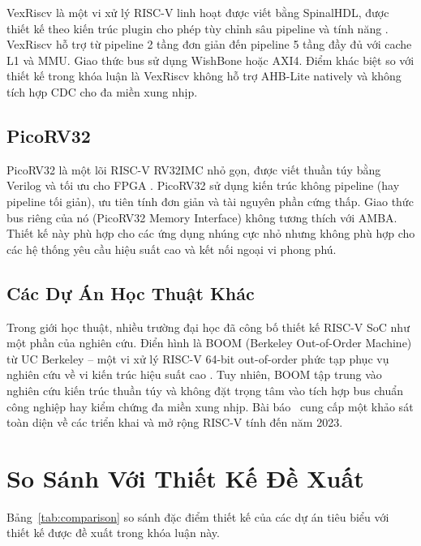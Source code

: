 VexRiscv là một vi xử lý RISC-V linh hoạt được viết bằng SpinalHDL, được thiết kế theo kiến trúc plugin cho phép tùy chỉnh sâu pipeline và tính năng \cite{vexriscv}. VexRiscv hỗ trợ từ pipeline 2 tầng đơn giản đến pipeline 5 tầng đầy đủ với cache L1 và MMU. Giao thức bus sử dụng WishBone hoặc AXI4. Điểm khác biệt so với thiết kế trong khóa luận là VexRiscv không hỗ trợ AHB-Lite natively và không tích hợp CDC cho đa miền xung nhịp.

\subsection{PicoRV32}

PicoRV32 là một lõi RISC-V RV32IMC nhỏ gọn, được viết thuần túy bằng Verilog và tối ưu cho FPGA \cite{picorv32}. PicoRV32 sử dụng kiến trúc không pipeline (hay pipeline tối giản), ưu tiên tính đơn giản và tài nguyên phần cứng thấp. Giao thức bus riêng của nó (PicoRV32 Memory Interface) không tương thích với AMBA. Thiết kế này phù hợp cho các ứng dụng nhúng cực nhỏ nhưng không phù hợp cho các hệ thống yêu cầu hiệu suất cao và kết nối ngoại vi phong phú.

\subsection{Các Dự Án Học Thuật Khác}

Trong giới học thuật, nhiều trường đại học đã công bố thiết kế RISC-V SoC như một phần của nghiên cứu. Điển hình là BOOM (Berkeley Out-of-Order Machine) từ UC Berkeley -- một vi xử lý RISC-V 64-bit out-of-order phức tạp phục vụ nghiên cứu về vi kiến trúc hiệu suất cao \cite{boom}. Tuy nhiên, BOOM tập trung vào nghiên cứu kiến trúc thuần túy và không đặt trọng tâm vào tích hợp bus chuẩn công nghiệp hay kiểm chứng đa miền xung nhịp. Bài báo~\cite{riscv-survey} cung cấp một khảo sát toàn diện về các triển khai và mở rộng RISC-V tính đến năm 2023.

\section{So Sánh Với Thiết Kế Đề Xuất}

Bảng~\ref{tab:comparison} so sánh đặc điểm thiết kế của các dự án tiêu biểu với thiết kế được đề xuất trong khóa luận này.

